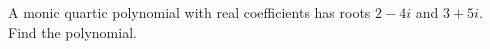 A monic quartic polynomial with real coefficients has roots $ 2-4i $ and $ 3+5i $. Find the polynomial.
